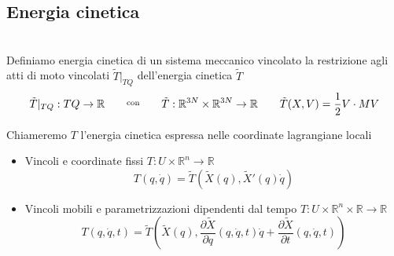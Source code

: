 \documentclass[11pt,a4paper,twoside]{book}
\newenvironment{definizione}[1][\empty]{\begin{Definizione}{
\ifx\empty#1\relax\else\mdseries\itshape#1\\\fi
}{}}{\end{Definizione}}
\theoremstyle{esss}
\theoremstyle{dotless}
\numberwithin{equation}{section} %
\begin{document}
\subsection{Energia cinetica}

\begin{definizione}
Definiamo energia cinetica di un sistema meccanico vincolato la restrizione agli atti di moto vincolati $\tilde{T}|_{TQ}$ dell'energia cinetica $\tilde{T}$
\[
\tilde{T}|_{TQ}:TQ\rightarrow\mathbb{R} \overset{\text{con}}{\hspace{0.15\linewidth}} \tilde{T}:\mathbb{R}^{3N}\times\mathbb{R}^{3N}\rightarrow \mathbb{R} \qquad \tilde{T}(X,V)=\dfrac{1}{2} V \cdot M V
\]
\end{definizione}
\begin{table}[H]
Chiameremo $T$ l'energia cinetica espressa nelle coordinate lagrangiane locali 
\begin{itemize}
\item Vincoli e coordinate fissi $T:U\times\mathbb{R}^n \rightarrow \mathbb{R}$ 
\[
T(q,\dot{q})=\tilde{T}\left(\tilde{X}(q),\tilde{X}'(q)\dot{q} \right)
\]
\item Vincoli mobili e parametrizzazioni dipendenti dal tempo $T:U\times\mathbb{R}^n \times\mathbb{R} \rightarrow \mathbb{R}$ 
\begin{equation}
T(q,\dot{q},t)=\tilde{T} \left( \tilde{X}(q), \dfrac{\partial\tilde{X}}{\partial q} (q,\dot{q},t)\dot{q}+\dfrac{\partial \tilde{X}}{\partial t} (q,\dot{q},t)\right)
\end{equation}
\end{itemize}
\end{table}
\end{document}
